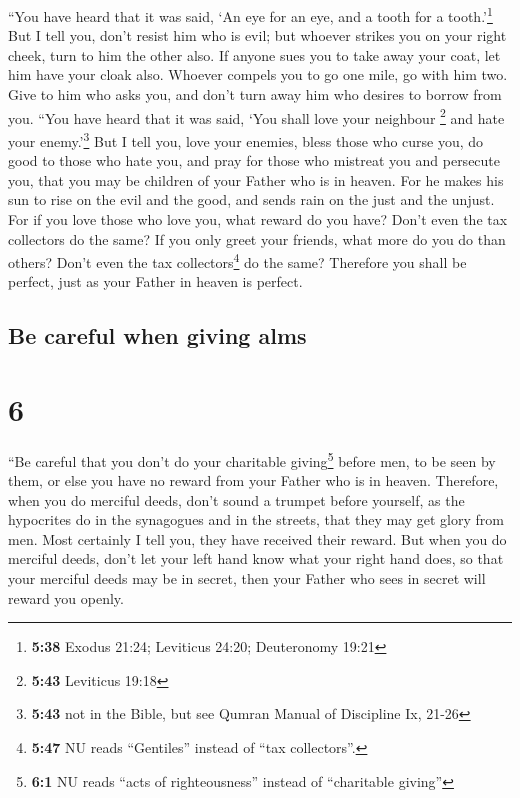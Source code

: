  ``You have heard that it was said, `An eye for an eye,
and a tooth for a tooth.'\footnote{\textbf{5:38} Exodus 21:24; Leviticus
  24:20; Deuteronomy 19:21}  But I tell you, don't resist
him who is evil; but whoever strikes you on your right cheek, turn to
him the other also.  If anyone sues you to take away your
coat, let him have your cloak also.  Whoever compels you
to go one mile, go with him two.  Give to him who asks
you, and don't turn away him who desires to borrow from you.
 ``You have heard that it was said, `You shall love your
neighbour \footnote{\textbf{5:43} Leviticus 19:18} and hate your
enemy.'\footnote{\textbf{5:43} not in the Bible, but see Qumran Manual
  of Discipline Ix, 21-26}  But I tell you, love your
enemies, bless those who curse you, do good to those who hate you, and
pray for those who mistreat you and persecute you,  that
you may be children of your Father who is in heaven. For he makes his
sun to rise on the evil and the good, and sends rain on the just and the
unjust.  For if you love those who love you, what reward
do you have? Don't even the tax collectors do the same? 
If you only greet your friends, what more do you do than others? Don't
even the tax collectors\footnote{\textbf{5:47} NU reads ``Gentiles''
  instead of ``tax collectors''.} do the same?  Therefore
you shall be perfect, just as your Father in heaven is perfect.

\hypertarget{be-careful-when-giving-alms}{%
\subsection{Be careful when giving
alms}\label{be-careful-when-giving-alms}}

\hypertarget{section-5}{%
\section{6}\label{section-5}}

 ``Be careful that you don't do your charitable
giving\footnote{\textbf{6:1} NU reads ``acts of righteousness'' instead
  of ``charitable giving''} before men, to be seen by them, or else you
have no reward from your Father who is in heaven. 
Therefore, when you do merciful deeds, don't sound a trumpet before
yourself, as the hypocrites do in the synagogues and in the streets,
that they may get glory from men. Most certainly I tell you, they have
received their reward.  But when you do merciful deeds,
don't let your left hand know what your right hand does, 
so that your merciful deeds may be in secret, then your Father who sees
in secret will reward you openly.

